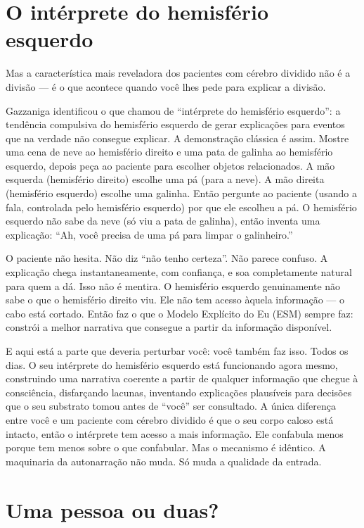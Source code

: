 \documentclass[11pt, twoside, openright]{book}
\begin{document}
\section*{O intérprete do hemisfério esquerdo}

Mas a característica mais reveladora dos pacientes com cérebro dividido não é a divisão --- é o que acontece quando você lhes pede para explicar a divisão.

Gazzaniga identificou o que chamou de ``intérprete do hemisfério esquerdo'': a tendência compulsiva do hemisfério esquerdo de gerar explicações para eventos que na verdade não consegue explicar. A demonstração clássica é assim. Mostre uma cena de neve ao hemisfério direito e uma pata de galinha ao hemisfério esquerdo, depois peça ao paciente para escolher objetos relacionados. A mão esquerda (hemisfério direito) escolhe uma pá (para a neve). A mão direita (hemisfério esquerdo) escolhe uma galinha. Então pergunte ao paciente (usando a fala, controlada pelo hemisfério esquerdo) por que ele escolheu a pá. O hemisfério esquerdo não sabe da neve (só viu a pata de galinha), então inventa uma explicação: ``Ah, você precisa de uma pá para limpar o galinheiro.''

O paciente não hesita. Não diz ``não tenho certeza''. Não parece confuso. A explicação chega instantaneamente, com confiança, e soa completamente natural para quem a dá. Isso não é mentira. O hemisfério esquerdo genuinamente não sabe o que o hemisfério direito viu. Ele não tem acesso àquela informação --- o cabo está cortado. Então faz o que o Modelo Explícito do Eu (ESM) sempre faz: constrói a melhor narrativa que consegue a partir da informação disponível.

E aqui está a parte que deveria perturbar você: você também faz isso. Todos os dias. O seu intérprete do hemisfério esquerdo está funcionando agora mesmo, construindo uma narrativa coerente a partir de qualquer informação que chegue à consciência, disfarçando lacunas, inventando explicações plausíveis para decisões que o seu substrato tomou antes de ``você'' ser consultado. A única diferença entre você e um paciente com cérebro dividido é que o seu corpo caloso está intacto, então o intérprete tem acesso a mais informação. Ele confabula menos porque tem menos sobre o que confabular. Mas o mecanismo é idêntico. A maquinaria da autonarração não muda. Só muda a qualidade da entrada.

\section*{Uma pessoa ou duas?}
\end{document}

